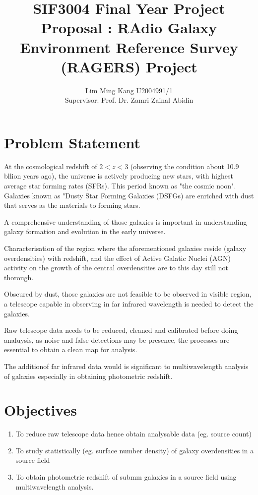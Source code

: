 \documentclass{article}
\title{SIF3004 Final Year Project Proposal : RAdio Galaxy Environment Reference Survey (RAGERS) Project }
\author{Lim Ming Kang U2004991/1\\[0.3cm]{Supervisor: Prof. Dr. Zamri Zainal Abidin}}
\begin{document}
\maketitle
\section{Problem Statement}

At the cosmological redshift of $2 < z < 3$ (observing the condition about 10.9 bllion years ago), the universe is actively producing new stars, with highest average star forming rates (SFRs). This period known as "the cosmic noon"\cite{Schreiber2020}. Galaxies known as "Dusty Star Forming Galaxies (DSFGs) are enriched with dust that serves as the materials to forming stars.
\medskip

\noindent A comprehensive understanding of those galaxies is important in understanding galaxy formation and evolution in the early universe.\cite{Geach2016}
\medskip

\noindent Characterisation of the region where the aforementioned galaxies reside (galaxy overdensities) with redshift, and the effect of Active Galatic Nuclei (AGN) activity on the growth of the central overdensities are to this day still not thorough.\cite{Ragers2021}
\medskip

\noindent Obscured by dust, those galaxies are not feasible to be observed in visible region, a telescope capable in observing in far infrared wavelength is needed to detect the galaxies.
\medskip

\noindent Raw telescope data needs to be reduced, cleaned and calibrated before doing analuysis, as noise and false detections may be presence, the processes are essential to obtain a clean map for analysis. 

\medskip

\noindent The additionof far infrared data would is significant to multiwavelength analysis of galaxies especially in obtaining photometric redshift.

\section{Objectives}
\begin{enumerate}
    \item To reduce raw telescope data hence obtain analysable data (eg. source count)
    \item To study statistically (eg. surface number density) of galaxy overdensities in a source field
    \item To obtain photometric redshift of submm galaxies in a source field using multiwavelength analysis.
\end{enumerate}
\end{document}
